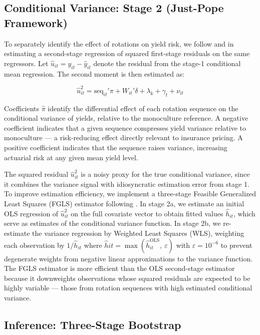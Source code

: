\documentclass[12pt,letterpaper]{article}
\theoremstyle{remark}
\theoremstyle{plain}
\theoremstyle{definition}
\begin{document}
\subsection{\label{subsec:stage_2}Conditional Variance: Stage 2 (Just-Pope Framework)}

To separately identify the effect of rotations on yield risk, we follow \cite{Just1979} and \cite{antle1983} in estimating a second-stage regression of squared first-stage residuals on the same regressors. Let $\hat{u}_{it} = y_{it} - \hat{y}_{it}$ denote
the residual from the stage-1 conditional mean regression. The second moment is then estimated as:

\begin{equation}
    \hat{u}_{it}^2 = \text{seq}_{it}'\pi + W_{it}'\delta + \lambda_k + \gamma_t + \nu_{it}
\end{equation}

Coefficients $\hat{\pi}$ identify the differential effect of each rotation sequence on the conditional variance of yields, relative to the monoculture reference. A negative coefficient indicates that a given sequence compresses yield variance relative to monoculture — a risk-reducing effect directly relevant to insurance pricing. A positive coefficient indicates that the sequence raises variance, increasing actuarial risk at any given mean yield level.

The squared residual $\hat{u}_{it}^2$ is a noisy proxy for the true conditional variance, since it combines the variance signal with idiosyncratic estimation error from stage 1. To improve estimation efficiency, we implement a three-stage Feasible Generalized Least Squares (FGLS) estimator following \cite{Harvey1976}. In stage 2a, we estimate an initial OLS regression of $\hat{u}_{it}^2$ on the full covariate vector to obtain fitted values $\hat{h}_{it}$, which serve as estimates of the conditional variance function. In stage 2b, we re-estimate the variance regression by Weighted Least Squares (WLS), weighting each observation by $1/\hat{h}_{it}$ where $\hat{h}{it}= \max(\hat{h}_{it}^{\text{OLS}},\ \varepsilon)$ with $\varepsilon = 10^{-6}$ to prevent degenerate weights from negative linear approximations to the variance function. The FGLS estimator is more efficient than the OLS second-stage estimator because it downweights observations whose squared residuals are expected to be highly variable — those from rotation sequences with high estimated conditional variance.

\subsection{\label{subsec:bootstrap}Inference: Three-Stage Bootstrap}
\end{document}
